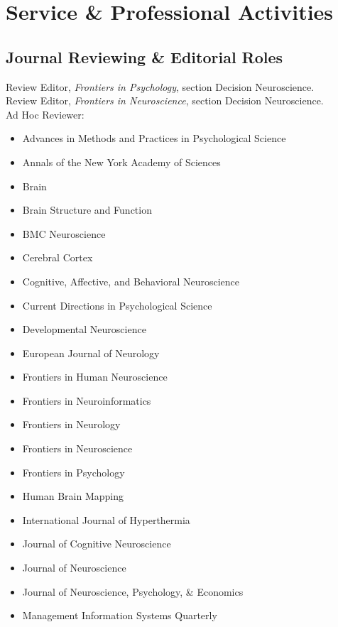 \documentclass[11pt, letterpaper]{article}
\newcommand{\years}[1]{\marginnote{\scriptsize #1}}
\begin{document}
\vspace{.2cm}
\section*{Service \& Professional Activities}

\subsection*{Journal Reviewing \& Editorial Roles}
\years{2015-2017}Review Editor, \textit{Frontiers in Psychology}, section Decision Neuroscience. \\
\years{2015-2017}Review Editor, \textit{Frontiers in Neuroscience}, section Decision Neuroscience. \\

Ad Hoc Reviewer:
\begin{multicols}{2}
\begin{itemize}[noitemsep]
\itshape
\item Advances in Methods and Practices in Psychological Science
\item Annals of the New York Academy of Sciences
\item Brain
\item Brain Structure and Function
\item BMC Neuroscience 
\item Cerebral Cortex 
\item Cognitive, Affective, and Behavioral Neuroscience 
\item Current Directions in Psychological Science
\item Developmental Neuroscience 
\item European Journal of Neurology
\item Frontiers in Human Neuroscience 
\item Frontiers in Neuroinformatics 
\item Frontiers in Neurology 
\item Frontiers in Neuroscience 
\item Frontiers in Psychology 
\item Human Brain Mapping 
\item International Journal of Hyperthermia 
\item Journal of Cognitive Neuroscience 
\item Journal of Neuroscience 
\item Journal of Neuroscience, Psychology, \& Economics
\item Management Information Systems Quarterly 

\end{itemize}
\end{multicols}
\end{document}
